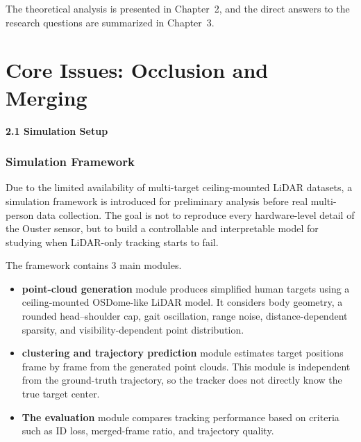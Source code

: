 \documentclass[11pt,a4paper]{report}
\newcommand{\boxitemtitle}[1]{
    \vspace{0.5em}
    {\large\textbf{\color{DeepBlue} #1}}\par
    \vspace{0.8em}
}
\begin{document}
The theoretical analysis is presented in Chapter~2, and the direct answers to the research questions are summarized in Chapter~3.

\newpage

\chapter{Core Issues: Occlusion and Merging}



\boxitemtitle{2.1 Simulation Setup}

\begin{contentbox}
\small
\setlength{\abovedisplayskip}{4pt}
\setlength{\belowdisplayskip}{4pt}
\setlength{\tabcolsep}{4pt}
\renewcommand{\arraystretch}{1.08}

\subsection*{Simulation Framework}

Due to the limited availability of multi-target ceiling-mounted LiDAR datasets, a simulation framework is introduced for preliminary analysis before real multi-person data collection. The goal is not to reproduce every hardware-level detail of the Ouster sensor, but to build a controllable and interpretable model for studying when LiDAR-only tracking starts to fail.

\vspace{0.35em}

The framework contains 3 main modules. 
\begin{itemize}
    \item  \textbf{point-cloud generation} module produces simplified human targets using a ceiling-mounted OSDome-like LiDAR model. It considers body geometry, a rounded head--shoulder cap, gait oscillation, range noise, distance-dependent sparsity, and visibility-dependent point distribution. 

\item  \textbf{clustering and trajectory prediction} module estimates target positions frame by frame from the generated point clouds. This module is independent from the ground-truth trajectory, so the tracker does not directly know the true target center. 

\item  \textbf{The evaluation} module compares tracking performance based on criteria such as ID loss, merged-frame ratio, and trajectory quality.
\end{itemize}


\end{contentbox}
\end{document}
